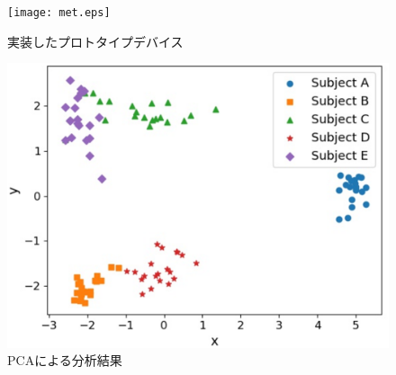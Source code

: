 \documentclass[Japanese,noauthor]{dicomopapers}
\begin{document}
\begin{figure}[!t]
  \begin{center}
    \texttt{[image: met.eps]}
  \end{center}
  \caption{実装したプロトタイプデバイス}
  \label{device}
\end{figure}

\begin{figure}[!t]
  \begin{center}
    \includegraphics[width=1\linewidth]{PCA.eps}
  \end{center}
  \caption{PCAによる分析結果}
  \label{pca}
\end{figure}



\end{document}
